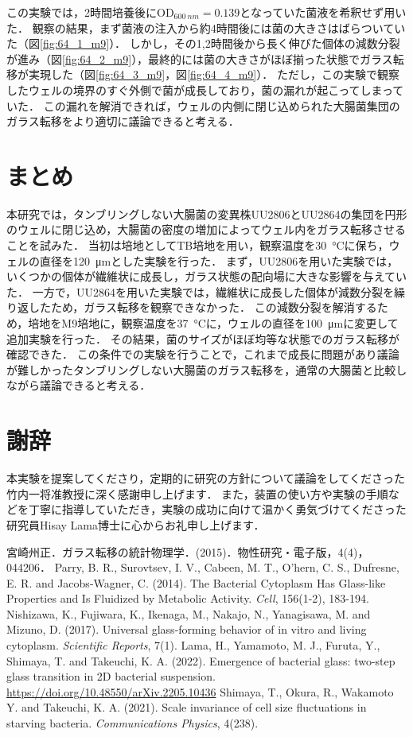 \documentclass[a4paper,11pt,titlepage]{jsarticle}
\begin{document}
この実験では，2時間培養後に$\mathrm{OD}_{\SI{600}{nm}}=0.139$となっていた菌液を希釈せず用いた．
観察の結果，まず菌液の注入から約4時間後には菌の大きさはばらついていた（図\ref{fig:64_1_m9}）．
しかし，その1,2時間後から長く伸びた個体の減数分裂が進み（図\ref{fig:64_2_m9}），最終的には菌の大きさがほぼ揃った状態でガラス転移が実現した（図\ref{fig:64_3_m9}，図\ref{fig:64_4_m9}）．
ただし，この実験で観察したウェルの境界のすぐ外側で菌が成長しており，菌の漏れが起こってしまっていた．
この漏れを解消できれば，ウェルの内側に閉じ込められた大腸菌集団のガラス転移をより適切に議論できると考える．

\section{まとめ}
本研究では，タンブリングしない大腸菌の変異株UU2806とUU2864の集団を円形のウェルに閉じ込め，大腸菌の密度の増加によってウェル内をガラス転移させることを試みた．
当初は培地としてTB培地を用い，観察温度を\SI{30}{\degreeCelsius}に保ち，ウェルの直径を\SI{120}{\um}とした実験を行った．
まず，UU2806を用いた実験では，いくつかの個体が繊維状に成長し，ガラス状態の配向場に大きな影響を与えていた．
一方で，UU2864を用いた実験では，繊維状に成長した個体が減数分裂を繰り返したため，ガラス転移を観察できなかった．
この減数分裂を解消するため，培地をM9培地に，観察温度を\SI{37}{\degreeCelsius}に，ウェルの直径を\SI{100}{\um}に変更して追加実験を行った．
その結果，菌のサイズがほぼ均等な状態でのガラス転移が確認できた．
この条件での実験を行うことで，これまで成長に問題があり議論が難しかったタンブリングしない大腸菌のガラス転移を，通常の大腸菌と比較しながら議論できると考える．

\section{謝辞}
本実験を提案してくださり，定期的に研究の方針について議論をしてくださった竹内一将准教授に深く感謝申し上げます．
また，装置の使い方や実験の手順などを丁寧に指導していただき，実験の成功に向けて温かく勇気づけてくださった研究員Hisay Lama博士に心からお礼申し上げます．

\begin{thebibliography}{99}
   宮崎州正．ガラス転移の統計物理学．(2015)．物性研究・電子版，4(4)，044206．
   Parry, B. R., Surovtsev, I. V., Cabeen, M. T., O’hern, C. S., Dufresne, E. R. and Jacobs-Wagner, C. (2014). The Bacterial Cytoplasm Has Glass-like Properties and Is Fluidized by Metabolic Activity. \textit{Cell}, 156(1-2), 183-194.
   Nishizawa, K., Fujiwara, K., Ikenaga, M., Nakajo, N., Yanagisawa, M. and Mizuno, D. (2017). Universal glass-forming behavior of in vitro and living cytoplasm. \textit{Scientific Reports}, 7(1).
   Lama, H., Yamamoto, M. J., Furuta, Y., Shimaya, T. and Takeuchi, K. A. (2022). Emergence of bacterial glass: two-step glass transition in 2D bacterial suspension. \\
  \url{https://doi.org/10.48550/arXiv.2205.10436}
   Shimaya, T., Okura, R.,  Wakamoto Y. and Takeuchi, K. A. (2021). Scale invariance of cell size fluctuations in starving bacteria. \textit{Communications Physics}, 4(238).  
\end{thebibliography}
\end{document}
